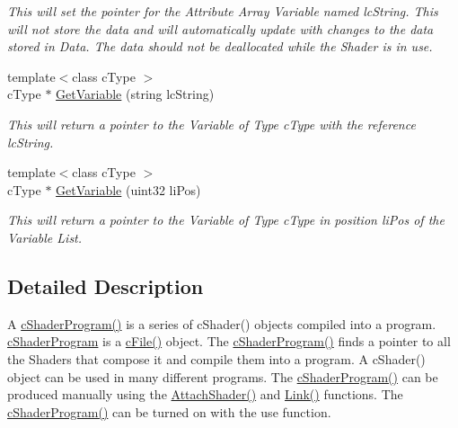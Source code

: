 \begin{DoxyCompactItemize}
\begin{DoxyCompactList}\small\item\em This will set the pointer for the Attribute Array Variable named lcString. This will not store the data and will automatically update with changes to the data stored in Data. The data should not be deallocated while the Shader is in use. \end{DoxyCompactList}\item 
\hypertarget{classc_shader_program_a732325d1dd8a9d7d58c180fdb54130fc}{
{\footnotesize template$<$class cType $>$ }\\cType $\ast$ \hyperlink{classc_shader_program_a732325d1dd8a9d7d58c180fdb54130fc}{GetVariable} (string lcString)}
\label{classc_shader_program_a732325d1dd8a9d7d58c180fdb54130fc}

\begin{DoxyCompactList}\small\item\em This will return a pointer to the Variable of Type cType with the reference lcString. \end{DoxyCompactList}\item 
\hypertarget{classc_shader_program_ac835acf65bc2484ca55bab4c79027b77}{
{\footnotesize template$<$class cType $>$ }\\cType $\ast$ \hyperlink{classc_shader_program_ac835acf65bc2484ca55bab4c79027b77}{GetVariable} (uint32 liPos)}
\label{classc_shader_program_ac835acf65bc2484ca55bab4c79027b77}

\begin{DoxyCompactList}\small\item\em This will return a pointer to the Variable of Type cType in position liPos of the Variable List. \end{DoxyCompactList}\end{DoxyCompactItemize}


\subsection{Detailed Description}
A \hyperlink{classc_shader_program_ab032906ae85885362543784fea60cc87}{cShaderProgram()} is a series of cShader() objects compiled into a program. \hyperlink{classc_shader_program}{cShaderProgram} is a \hyperlink{classc_file_a5bb81f36e954af61b581e3c1fd06e0de}{cFile()} object. The \hyperlink{classc_shader_program_ab032906ae85885362543784fea60cc87}{cShaderProgram()} finds a pointer to all the Shaders that compose it and compile them into a program. A cShader() object can be used in many different programs. The \hyperlink{classc_shader_program_ab032906ae85885362543784fea60cc87}{cShaderProgram()} can be produced manually using the \hyperlink{classc_shader_program_a0f0adf11f436c0d8149b6c5e196fe859}{AttachShader()} and \hyperlink{classc_shader_program_a2e6bc46c158959bcea66b4e321416b72}{Link()} functions. The \hyperlink{classc_shader_program_ab032906ae85885362543784fea60cc87}{cShaderProgram()} can be turned on with the use function. 